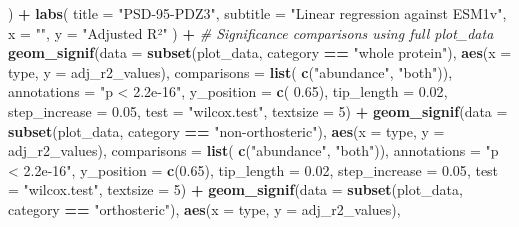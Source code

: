 \documentclass[
]{article}
\newenvironment{Shaded}{\begin{snugshade}}{\end{snugshade}}
\newcommand{\AttributeTok}[1]{\textcolor[rgb]{0.13,0.29,0.53}{#1}}
\newcommand{\CommentTok}[1]{\textcolor[rgb]{0.56,0.35,0.01}{\textit{#1}}}
\newcommand{\DecValTok}[1]{\textcolor[rgb]{0.00,0.00,0.81}{#1}}
\newcommand{\FloatTok}[1]{\textcolor[rgb]{0.00,0.00,0.81}{#1}}
\newcommand{\FunctionTok}[1]{\textcolor[rgb]{0.13,0.29,0.53}{\textbf{#1}}}
\newcommand{\NormalTok}[1]{#1}
\newcommand{\SpecialCharTok}[1]{\textcolor[rgb]{0.81,0.36,0.00}{\textbf{#1}}}
\newcommand{\StringTok}[1]{\textcolor[rgb]{0.31,0.60,0.02}{#1}}
\begin{document}
\begin{Shaded}
\begin{Highlighting}[]
\NormalTok{  ) }\SpecialCharTok{+}
  \FunctionTok{labs}\NormalTok{(}
    \AttributeTok{title =} \StringTok{"PSD{-}95{-}PDZ3"}\NormalTok{, }
    \AttributeTok{subtitle =} \StringTok{"Linear regression against ESM1v"}\NormalTok{, }
    \AttributeTok{x =} \StringTok{""}\NormalTok{, }
    \AttributeTok{y =} \StringTok{"Adjusted R²"}
\NormalTok{  ) }\SpecialCharTok{+}
  \CommentTok{\# Significance comparisons using full plot\_data}
  \FunctionTok{geom\_signif}\NormalTok{(}\AttributeTok{data =} \FunctionTok{subset}\NormalTok{(plot\_data, category }\SpecialCharTok{==} \StringTok{"whole protein"}\NormalTok{),}
              \FunctionTok{aes}\NormalTok{(}\AttributeTok{x =}\NormalTok{ type, }\AttributeTok{y =}\NormalTok{ adj\_r2\_values),}
              \AttributeTok{comparisons =} \FunctionTok{list}\NormalTok{( }\FunctionTok{c}\NormalTok{(}\StringTok{"abundance"}\NormalTok{, }\StringTok{"both"}\NormalTok{)),}
              \AttributeTok{annotations =} \StringTok{"p \textless{} 2.2e{-}16"}\NormalTok{,}
              \AttributeTok{y\_position =} \FunctionTok{c}\NormalTok{( }\FloatTok{0.65}\NormalTok{),}
              \AttributeTok{tip\_length =} \FloatTok{0.02}\NormalTok{,}
              \AttributeTok{step\_increase =} \FloatTok{0.05}\NormalTok{,}
              \AttributeTok{test =} \StringTok{"wilcox.test"}\NormalTok{,}
              \AttributeTok{textsize =} \DecValTok{5}\NormalTok{) }\SpecialCharTok{+}
  \FunctionTok{geom\_signif}\NormalTok{(}\AttributeTok{data =} \FunctionTok{subset}\NormalTok{(plot\_data, category }\SpecialCharTok{==} \StringTok{"non{-}orthosteric"}\NormalTok{),}
              \FunctionTok{aes}\NormalTok{(}\AttributeTok{x =}\NormalTok{ type, }\AttributeTok{y =}\NormalTok{ adj\_r2\_values),}
              \AttributeTok{comparisons =} \FunctionTok{list}\NormalTok{( }\FunctionTok{c}\NormalTok{(}\StringTok{"abundance"}\NormalTok{, }\StringTok{"both"}\NormalTok{)),}
              \AttributeTok{annotations =} \StringTok{"p \textless{} 2.2e{-}16"}\NormalTok{,}
              \AttributeTok{y\_position =} \FunctionTok{c}\NormalTok{(}\FloatTok{0.65}\NormalTok{),}
              \AttributeTok{tip\_length =} \FloatTok{0.02}\NormalTok{,}
              \AttributeTok{step\_increase =} \FloatTok{0.05}\NormalTok{,}
              \AttributeTok{test =} \StringTok{"wilcox.test"}\NormalTok{,}
              \AttributeTok{textsize =} \DecValTok{5}\NormalTok{) }\SpecialCharTok{+}
  \FunctionTok{geom\_signif}\NormalTok{(}\AttributeTok{data =} \FunctionTok{subset}\NormalTok{(plot\_data, category }\SpecialCharTok{==} \StringTok{"orthosteric"}\NormalTok{),}
              \FunctionTok{aes}\NormalTok{(}\AttributeTok{x =}\NormalTok{ type, }\AttributeTok{y =}\NormalTok{ adj\_r2\_values),}

\end{Highlighting}
\end{Shaded}
\end{document}
